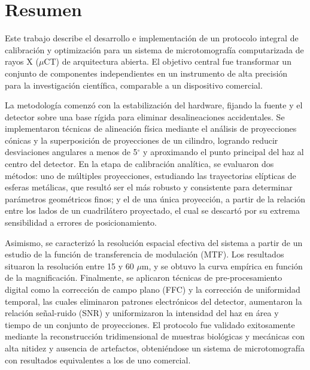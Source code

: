 \setcounter{page}{1}
\chapter*{Resumen}

Este trabajo describe el desarrollo e implementación de un protocolo integral de
calibración y optimización para un sistema de microtomografía computarizada de rayos X ($\mu$CT)
de arquitectura abierta. El objetivo central fue transformar un conjunto de componentes
independientes en un instrumento de alta precisión para la investigación científica,
comparable a un dispositivo comercial.

La metodología comenzó con la estabilización del hardware, fijando la fuente y el
detector sobre una base rígida para eliminar desalineaciones accidentales. Se
implementaron técnicas de alineación física mediante el análisis de proyecciones
cónicas y la superposición de proyecciones de un cilindro, logrando reducir desviaciones angulares
a menos de 5$^{\circ}$ y aproximando el punto principal del haz al centro del detector. En
la etapa de calibración analítica, se evaluaron dos métodos: uno
de múltiples proyecciones, estudiando las trayectorias elípticas de esferas metálicas,
que resultó ser el más robusto y consistente para
determinar parámetros geométricos finos; y el de una única proyección, a partir de
la relación entre los lados de un cuadrilátero proyectado, el cual se
descartó por su extrema sensibilidad a errores de posicionamiento.

Asimismo, se caracterizó la resolución espacial efectiva del sistema a partir de un
estudio de la función de transferencia de modulación
(MTF). Los resultados situaron la resolución entre 15 y 60 $\mu$m, y se obtuvo la
curva empírica en función de la magnificación. Finalmente, se aplicaron técnicas de pre-procesamiento
digital como la corrección de campo plano (FFC) y la corrección de uniformidad
temporal, las cuales eliminaron patrones electrónicos del detector, aumentaron
la relación señal-ruido (SNR) y uniformizaron la intensidad del haz en área y tiempo
de un conjunto de proyecciones. El protocolo fue validado
exitosamente mediante la reconstrucción tridimensional de muestras biológicas y
mecánicas con alta nitidez y ausencia de artefactos, obteniéndose un sistema de microtomografía
con resultados equivalentes a los de uno comercial.
